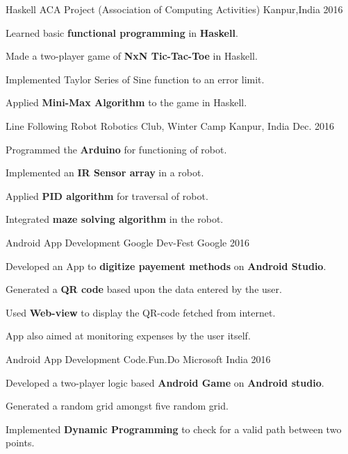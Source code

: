 \begin{cventries}

  \cventry
   {Haskell}
   {ACA Project (Association of Computing Activities)}
  {Kanpur,India}
  {2016}
  {
    \begin{cvitems}
      \item Learned basic \textbf{functional programming} in \textbf{Haskell}.
      \item Made a two-player game of \textbf{NxN Tic-Tac-Toe} in Haskell.
      \item Implemented Taylor Series of Sine function to an error limit.
      \item Applied \textbf{Mini-Max Algorithm} to the game in Haskell.
    \end{cvitems}
  }

  \cventry
  {Line Following Robot}
  {Robotics Club, Winter Camp}
  {Kanpur, India}
  {Dec. 2016}
  {
    \begin{cvitems}
      \item Programmed the \textbf{Arduino} for functioning of robot.
      \item Implemented an \textbf{IR Sensor array} in a robot.
      \item Applied \textbf{PID algorithm} for traversal of robot.
      \item Integrated \textbf{maze solving algorithm} in the robot.
    \end{cvitems}
  }

  \cventry
  {Android App Development}
  {Google Dev-Fest}
  {Google}
  {2016}
  {
    \begin{cvitems}
    \item Developed an App to \textbf{digitize payement methods} on \textbf{Android Studio}.
    \item Generated a \textbf{QR code} based upon the data entered by the user.
    \item Used \textbf{Web-view} to display the QR-code fetched from internet.
    \item App also aimed at monitoring expenses by the user itself.
    \end{cvitems}
  }

  \cventry
  {Android App Development}
  {Code.Fun.Do}
  {Microsoft India}
  {2016}
  {
    \begin{cvitems}
    \item Developed a two-player logic based \textbf{Android Game} on \textbf{Android studio}.
    \item Generated a random grid amongst five random grid.
    \item Implemented \textbf{Dynamic Programming} to check for a valid path between two points.
    \end{cvitems}
  }
\end{cventries}
